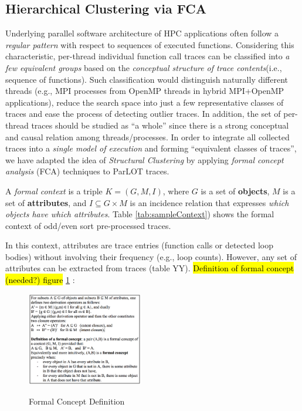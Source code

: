 \subsection{Hierarchical Clustering via FCA}
Underlying parallel software architecture of HPC applications often follow a \textit{regular pattern} with respect to sequences of executed functions. 
%
Considering this characteristic, per-thread individual function call traces can be classified into \textit{a few equivalent groups} based on the \textit{conceptual structure of trace contents}(i.e., sequence of functions).
% 
Such classification would distinguish naturally different threads (e.g., MPI processes from OpenMP threads in hybrid MPI+OpenMP applications), reduce the search space into just a few representative classes of traces and ease the process of detecting outlier traces.
%
In addition, the set of per-thread traces should be studied as ``a whole'' since there is a strong conceptual and causal relation among threads/processes.
%
In order to integrate all collected traces into a \textit{single model of execution} and forming ``equivalent classes of traces'', we have adapted the idea of \textit{Structural Clustering}  \cite{weberStructural} by applying \textit{formal concept analysis} (FCA)\cite{clbook} techniques to ParLOT traces.
%

A \textit{formal context} is a triple $K = (G, M, I)$, where $G$ is a set of \textbf{objects}, $M$ is a set of \textbf{attributes}, and $I \subseteq G \times M$ is an incidence relation that expresses \textit{which objects have which attributes}. Table \ref{tab:sampleContext}) shows the formal context of odd/even sort pre-processed traces. 

%
In this context, attributes are trace entries (function calls or detected loop bodies) without involving their frequency (e.g., loop counts). However, any set of attributes can be extracted from traces (table YY).
%
\hl{Definition of formal concept (needed?) figure }\ref{fig:formalConceptDefinition} :

\begin{figure}[]
\centering
\caption{Formal Concept Definition}
\includegraphics[width=0.45\textwidth]{figs/formalConceptDefinition.png}
\label{fig:formalConceptDefinition}
\end{figure}

